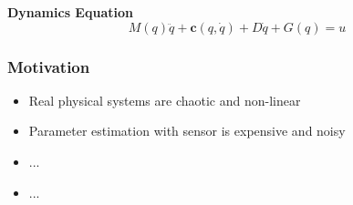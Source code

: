 \begin{frame}
    \vspace{1em}
    
    \textbf{Dynamics Equation}
    \begin{equation}
        M(q)\ddot{q} + \mathbf{c}(q, \dot{q}) + D\dot{q} + G(q) = u
    \end{equation}

   
\end{frame}

\begin{frame}
    \frametitle{Motivation}

    \begin{itemize}
        \item Real physical systems are chaotic and non-linear
        \item Parameter estimation with sensor is expensive and noisy
        \item ...
        \item ...
    \end{itemize}

\end{frame}


